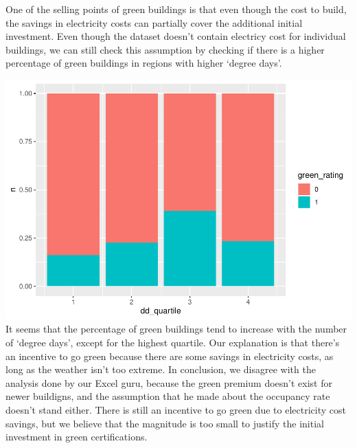 \documentclass[]{article}
\newenvironment{Shaded}{\begin{snugshade}}{\end{snugshade}}
\newcommand{\DataTypeTok}[1]{\textcolor[rgb]{0.13,0.29,0.53}{#1}}
\newcommand{\DecValTok}[1]{\textcolor[rgb]{0.00,0.00,0.81}{#1}}
\newcommand{\KeywordTok}[1]{\textcolor[rgb]{0.13,0.29,0.53}{\textbf{#1}}}
\newcommand{\NormalTok}[1]{#1}
\newcommand{\OperatorTok}[1]{\textcolor[rgb]{0.81,0.36,0.00}{\textbf{#1}}}
\newcommand{\StringTok}[1]{\textcolor[rgb]{0.31,0.60,0.02}{#1}}
\begin{document}
One of the selling points of green buildings is that even though the
cost to build, the savings in electricity costs can partially cover the
additional initial investment. Even though the dataset doesn't contain
electricy cost for individual buildings, we can still check this
assumption by checking if there is a higher percentage of green
buildings in regions with higher `degree days'.

\begin{Shaded}
\end{Shaded}

\includegraphics{STA380_exercise_George_files/figure-latex/unnamed-chunk-5-1.pdf}
It seems that the percentage of green buildings tend to increase with
the number of `degree days', except for the highest quartile. Our
explanation is that there's an incentive to go green because there are
some savings in electricity costs, as long as the weather isn't too
extreme. In conclusion, we disagree with the analysis done by our Excel
guru, because the green premium doesn't exist for newer buildigns, and
the assumption that he made about the occupancy rate doesn't stand
either. There is still an incentive to go green due to electricity cost
savings, but we believe that the magnitude is too small to justify the
initial investment in green certifications.
\end{document}
